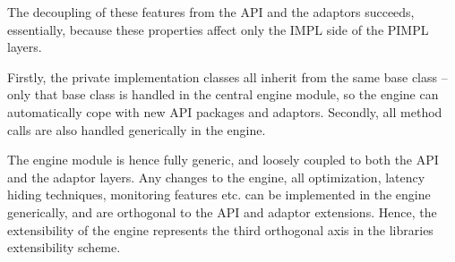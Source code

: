 	The decoupling of these features from the API and 
  the adaptors succeeds, essentially, because these properties 
  affect only the IMPL side of the PIMPL layers.  

  Firstly, the private implementation classes all inherit from the same
  base class -- only that base class is handled in the central engine
  module, so the engine can automatically cope with new API packages
  and adaptors.  Secondly, all method calls are also handled
  generically in the engine.
  
  The engine module is hence fully generic, and loosely coupled to
  both the API and the adaptor layers.  Any changes to the engine, all
  optimization, latency hiding techniques, monitoring features etc.
  can be implemented in the engine generically, and are orthogonal to
  the API and adaptor extensions.  Hence, the extensibility of the
  engine represents the third orthogonal axis in the libraries
  extensibility scheme.


